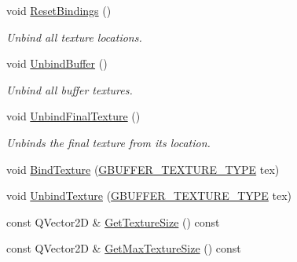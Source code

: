 \begin{DoxyCompactItemize}
void \mbox{\hyperlink{class_geometry_engine_1_1_geometry_buffer_1_1_g_buffer_a1ef28cc887dbd56d20ae4df0617b8eb1}{Reset\+Bindings}} ()
\begin{DoxyCompactList}\small\item\em Unbind all texture locations. \end{DoxyCompactList}\item 
\mbox{\label{class_geometry_engine_1_1_geometry_buffer_1_1_g_buffer_a2c24808c13f616bcc3ca6ed321277e95}} 
void \mbox{\hyperlink{class_geometry_engine_1_1_geometry_buffer_1_1_g_buffer_a2c24808c13f616bcc3ca6ed321277e95}{Unbind\+Buffer}} ()
\begin{DoxyCompactList}\small\item\em Unbind all buffer textures. \end{DoxyCompactList}\item 
\mbox{\label{class_geometry_engine_1_1_geometry_buffer_1_1_g_buffer_a954286e665d76dc77f352923a3c0b191}} 
void \mbox{\hyperlink{class_geometry_engine_1_1_geometry_buffer_1_1_g_buffer_a954286e665d76dc77f352923a3c0b191}{Unbind\+Final\+Texture}} ()
\begin{DoxyCompactList}\small\item\em Unbinds the final texture from its location. \end{DoxyCompactList}\item 
void \mbox{\hyperlink{class_geometry_engine_1_1_geometry_buffer_1_1_g_buffer_a6a2469afe0c79b97d35ba5d2b6a1ae52}{Bind\+Texture}} (\mbox{\hyperlink{class_geometry_engine_1_1_geometry_buffer_1_1_g_buffer_a718dceafcac1915f7de061108597e1cc}{G\+B\+U\+F\+F\+E\+R\+\_\+\+T\+E\+X\+T\+U\+R\+E\+\_\+\+T\+Y\+PE}} tex)
\item 
void \mbox{\hyperlink{class_geometry_engine_1_1_geometry_buffer_1_1_g_buffer_a15ffb63e72295abb6a10b2481fb878e4}{Unbind\+Texture}} (\mbox{\hyperlink{class_geometry_engine_1_1_geometry_buffer_1_1_g_buffer_a718dceafcac1915f7de061108597e1cc}{G\+B\+U\+F\+F\+E\+R\+\_\+\+T\+E\+X\+T\+U\+R\+E\+\_\+\+T\+Y\+PE}} tex)
\item 
const Q\+Vector2D \& \mbox{\hyperlink{class_geometry_engine_1_1_geometry_buffer_1_1_g_buffer_a2b829115597fc587cd6f4ddb52b875cc}{Get\+Texture\+Size}} () const
\item 
const Q\+Vector2D \& \mbox{\hyperlink{class_geometry_engine_1_1_geometry_buffer_1_1_g_buffer_a47bda4849000d2728538de4e2f27f11a}{Get\+Max\+Texture\+Size}} () const

\end{DoxyCompactItemize}
